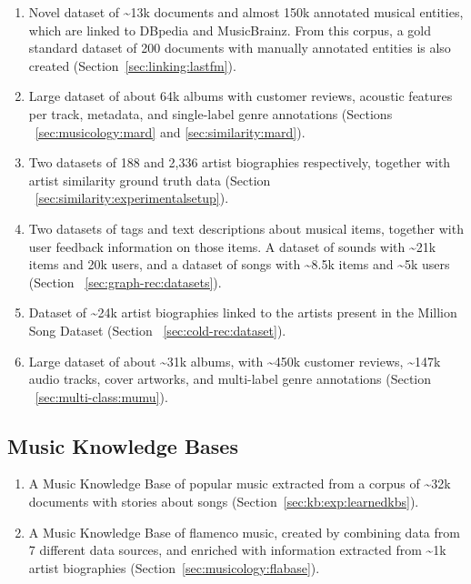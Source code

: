 \begin{enumerate}

\item 
Novel dataset of \~{}13k documents and almost 150k annotated musical entities, which are linked to DBpedia and MusicBrainz. From this corpus, a gold standard dataset of 200 documents with manually annotated entities is also created (Section~\ref{sec:linking:lastfm}).

\item
Large dataset of about 64k albums with customer reviews, acoustic features per track, metadata, and single-label genre annotations (Sections ~\ref{sec:musicology:mard} and \ref{sec:similarity:mard}).

\item
Two datasets of 188 and 2,336 artist biographies respectively, together with artist similarity ground truth data (Section ~\ref{sec:similarity:experimentalsetup}).

\item
Two datasets of tags and text descriptions about musical items, together with user feedback information on those items. A dataset of sounds with \~{}21k items and 20k users, and a dataset of songs with \~{}8.5k items and \~{}5k users (Section ~\ref{sec:graph-rec:datasets}).

\item
Dataset of \~{}24k artist biographies linked to the artists present in the Million Song Dataset (Section ~\ref{sec:cold-rec:dataset}).

\item
Large dataset of about \~{}31k albums, with \~{}450k customer reviews, \~{}147k audio tracks, cover artworks, and multi-label genre annotations (Section ~\ref{sec:multi-class:mumu}).

\end{enumerate}

\subsection{Music Knowledge Bases}

\begin{enumerate}
\item
A Music Knowledge Base of popular music extracted from a corpus of \~{}32k documents with stories about songs (Section~\ref{sec:kb:exp:learnedkbs}).

\item
A Music Knowledge Base of flamenco music, created by combining data from 7 different data sources, and enriched with information extracted from \~{}1k artist biographies (Section~\ref{sec:musicology:flabase}).

\end{enumerate}

